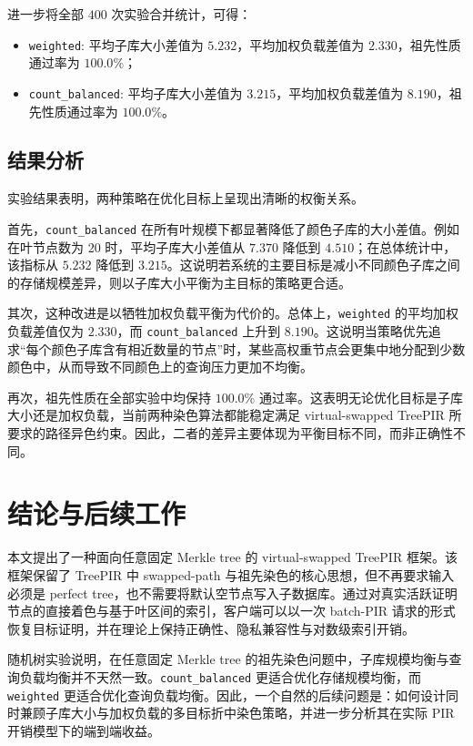 \documentclass[UTF8]{ctexart}
\begin{document}
	进一步将全部 $400$ 次实验合并统计，可得：
	\begin{itemize}
		\item \texttt{weighted}: 平均子库大小差值为 $5.232$，平均加权负载差值为 $2.330$，祖先性质通过率为 $100.0\%$；
		\item \texttt{count\_balanced}: 平均子库大小差值为 $3.215$，平均加权负载差值为 $8.190$，祖先性质通过率为 $100.0\%$。
	\end{itemize}
	
	\subsection{结果分析}
	
	实验结果表明，两种策略在优化目标上呈现出清晰的权衡关系。
	
	首先，\texttt{count\_balanced} 在所有叶规模下都显著降低了颜色子库的大小差值。例如在叶节点数为 $20$ 时，平均子库大小差值从 $7.370$ 降低到 $4.510$；在总体统计中，该指标从 $5.232$ 降低到 $3.215$。这说明若系统的主要目标是减小不同颜色子库之间的存储规模差异，则以子库大小平衡为主目标的策略更合适。
	
	其次，这种改进是以牺牲加权负载平衡为代价的。总体上，\texttt{weighted} 的平均加权负载差值仅为 $2.330$，而 \texttt{count\_balanced} 上升到 $8.190$。这说明当策略优先追求“每个颜色子库含有相近数量的节点”时，某些高权重节点会更集中地分配到少数颜色中，从而导致不同颜色上的查询压力更加不均衡。
	
	再次，祖先性质在全部实验中均保持 $100.0\%$ 通过率。这表明无论优化目标是子库大小还是加权负载，当前两种染色算法都能稳定满足 virtual-swapped TreePIR 所要求的路径异色约束。因此，二者的差异主要体现为平衡目标不同，而非正确性不同。
	
	\section{结论与后续工作}
	
	本文提出了一种面向任意固定 Merkle tree 的 virtual-swapped TreePIR 框架。该框架保留了 TreePIR 中 swapped-path 与祖先染色的核心思想，但不再要求输入必须是 perfect tree，也不需要将默认空节点写入子数据库。通过对真实活跃证明节点的直接着色与基于叶区间的索引，客户端可以以一次 batch-PIR 请求的形式恢复目标证明，并在理论上保持正确性、隐私兼容性与对数级索引开销。
	
	随机树实验说明，在任意固定 Merkle tree 的祖先染色问题中，子库规模均衡与查询负载均衡并不天然一致。\texttt{count\_balanced} 更适合优化存储规模均衡，而 \texttt{weighted} 更适合优化查询负载均衡。因此，一个自然的后续问题是：如何设计同时兼顾子库大小与加权负载的多目标折中染色策略，并进一步分析其在实际 PIR 开销模型下的端到端收益。
	
\end{document}
